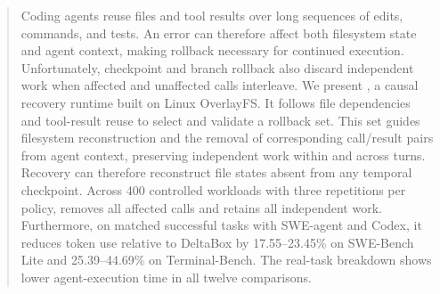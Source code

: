 \begin{abstract}
Coding agents reuse files and tool results over long sequences of edits,
commands, and tests. An error can therefore affect both filesystem state and
agent context, making rollback necessary for continued execution.
Unfortunately, checkpoint and branch rollback also discard independent work
when affected and unaffected calls interleave.
We present \system, a causal recovery runtime built on Linux OverlayFS.
It follows file dependencies and tool-result reuse to select and validate
a rollback set. This set guides filesystem reconstruction and
the removal of corresponding call/result pairs from agent context,
preserving independent work within and across turns. Recovery can therefore
reconstruct file states absent from any temporal checkpoint.
Across 400 controlled workloads with three repetitions per policy, \system
removes all affected calls and retains all independent work. Furthermore,
on matched successful tasks with SWE-agent and Codex, it reduces token use
relative to DeltaBox by 17.55--23.45\% on SWE-Bench Lite
and 25.39--44.69\% on Terminal-Bench. The real-task breakdown shows
lower agent-execution time in all twelve comparisons.
\end{abstract}
